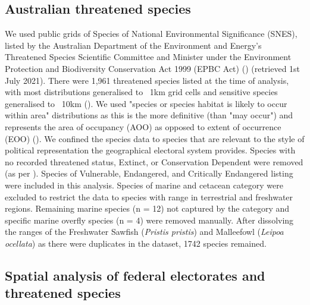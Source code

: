 \documentclass[a4paper,11pt]{article}
\begin{document}
\subsection{Australian threatened species}

We used public grids of Species of National Environmental Significance (SNES), listed by the Australian Department of the Environment and Energy’s Threatened Species Scientific Committee and Minister under the Environment Protection and Biodiversity Conservation Act 1999 (EPBC Act) (\cite{commonwealthofaustraliaThreatenedSpeciesEPBC2021}) (retrieved 1st July 2021). There were 1,961 threatened species listed at the time of analysis, with most distributions generalised to ~1km grid cells and sensitive species generalised to ~10km (\cite{commonwealthofaustraliaThreatenedSpeciesEPBC2021}). We used "species or species habitat is likely to occur within area" distributions as this is the more definitive (than "may occur") and represents the area of occupancy (AOO) as opposed to extent of occurrence (EOO) (\cite{gastonSizesSpeciesGeographic2009, lloydEstimatingSpatialCoverage2020}). We confined the species data to species that are relevant to the style of political representation the geographical electoral system provides. Species with no recorded threatened status, Extinct, or Conservation Dependent were removed (as per \cite{wardNationalscaleDatasetThreats}). Species of Vulnerable, Endangered, and Critically Endangered listing were included in this analysis. Species of marine and cetacean category were excluded to restrict the data to species with range in terrestrial and freshwater regions. Remaining marine species (n = 12) not captured by the category and specific marine overfly species (n = 4) were removed manually. After dissolving the ranges of the Freshwater Sawfish (\emph{Pristis pristis}) and Malleefowl (\emph{Leipoa ocellata}) as there were duplicates in the dataset, 1742 species remained.

\subsection{Spatial analysis of federal electorates and threatened species}
\end{document}
